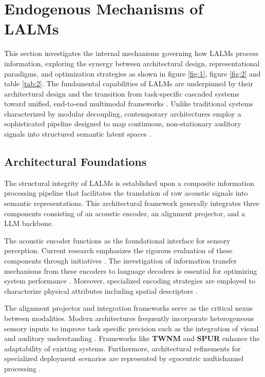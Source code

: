 \section{Endogenous Mechanisms of LALMs}

This section investigates the internal mechanisms governing how LALMs process information, exploring the synergy between architectural design, representational paradigms, and optimization strategies as shown in figure \ref{fig:1}, figure \ref{fig:2} and table \ref{tab:2}. The fundamental capabilities of LALMs are underpinned by their architectural design and the transition from task-specific cascaded systems toward unified, end-to-end multimodal frameworks \cite{zhang2023speechgpt, rubenstein2023audiopalm}. Unlike traditional systems characterized by modular decoupling, contemporary architectures employ a sophisticated pipeline designed to map continuous, non-stationary auditory signals into structured semantic latent spaces \cite{tang2023salmonn, chu2024qwen2}.

\subsection{Architectural Foundations}
The structural integrity of LALMs is established upon a composite information processing pipeline that facilitates the translation of raw acoustic signals into semantic representations. This architectural framework generally integrates three components consisting of an acoustic encoder, an alignment projector, and a LLM backbone.

The acoustic encoder functions as the foundational interface for sensory perception. Current research emphasizes the rigorous evaluation of these components through initiatives \cite{ma2026interspeech}. The investigation of information transfer mechanisms from these encoders to language decoders is essential for optimizing system performance \cite{alex2025pal}. Moreover, specialized encoding strategies are employed to characterize physical attributes including spatial descriptors \cite{jiang2026sci}.

The alignment projector and integration frameworks serve as the critical nexus between modalities. Modern architectures frequently incorporate heterogeneous sensory inputs to improve task specific precision such as the integration of visual and auditory understanding \cite{zhao2025hears}. Frameworks like \textbf{TWNM} \cite{you2026world} and \textbf{SPUR} \cite{sakshi2025spur} enhance the adaptability of existing systems. Furthermore, architectural refinements for specialized deployment scenarios are represented by egocentric multichannel processing \cite{lin2025wearvox}.

